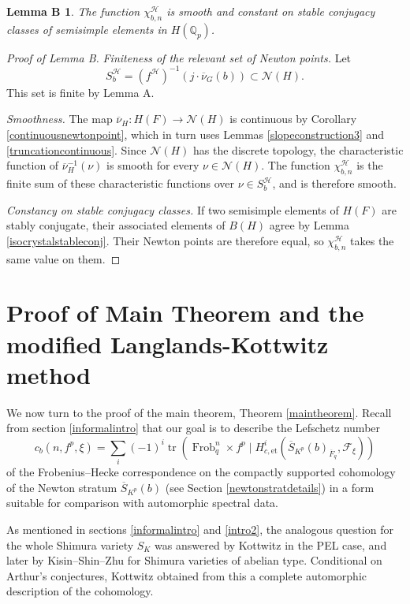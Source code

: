 \documentclass[11pt,a4paper]{article}
\theoremstyle{definition}
\theoremstyle{plain}
\theoremstyle{remark}
\theoremstyle{plain}
\newtheorem*{LemB}{Lemma B}
\DeclareMathOperator{\Frob}{Frob}
\DeclareMathOperator{\tr}{tr}
\begin{document}
\begin{LemB}
    The function $\chi_{b,n}^{\mathcal{H}}$ is smooth and constant on stable conjugacy classes of semisimple elements in $H(\mathbb{Q}_p)$.
\end{LemB}

\begin{proof}[Proof of Lemma B]
    \textit{Finiteness of the relevant set of Newton points.} Let
    $$S_b^{\mathcal H}=(f^{\mathcal H})^{-1}(j\cdot\overline{\nu}_G(b))\subset\mathcal N(H).$$
    This set is finite by Lemma A.

    \textit{Smoothness.} The map $\overline{\nu}_H:H(F)\rightarrow\mathcal N(H)$ is continuous by Corollary \ref{continuousnewtonpoint}, which in turn uses Lemmas \ref{slopeconstruction3} and \ref{truncationcontinuous}. Since $\mathcal N(H)$ has the discrete topology, the characteristic function of $\overline{\nu}_H^{-1}(\nu)$ is smooth for every $\nu\in\mathcal N(H)$. The function $\chi_{b,n}^{\mathcal H}$ is the finite sum of these characteristic functions over $\nu\in S_b^{\mathcal H}$, and is therefore smooth.

    \textit{Constancy on stable conjugacy classes.} If two semisimple elements of $H(F)$ are stably conjugate, their associated elements of $B(H)$ agree by Lemma \ref{isocrystalstableconj}. Their Newton points are therefore equal, so $\chi_{b,n}^{\mathcal H}$ takes the same value on them.
\end{proof}

\section{Proof of Main Theorem and the modified Langlands-Kottwitz method}\label{mainproof}

We now turn to the proof of the main theorem, Theorem \ref{maintheorem}. Recall from section \ref{informalintro} that our goal is to describe the Lefschetz number
$$c_b(n, f^p, \xi) = \sum_i (-1)^i \tr(\Frob_q^n \times f^p \mid H^i_{c,\mathrm{et}}(\overline{S}_{K^p}(b)_{\overline{F}_q}, \mathcal{F}_{\xi}))$$
of the Frobenius--Hecke correspondence on the compactly supported cohomology of the Newton stratum $\overline{S}_{K^p}(b)$ (see Section \ref{newtonstratdetails}) in a form suitable for comparison with automorphic spectral data.

As mentioned in sections \ref{informalintro} and \ref{intro2}, the analogous question for the whole Shimura variety $S_K$ was answered by Kottwitz \cite{MR1044820} in the PEL case, and later by Kisin--Shin--Zhu \cite{kisin2021stabletraceformulashimura} for Shimura varieties of abelian type. Conditional on Arthur's conjectures, Kottwitz obtained from this a complete automorphic description of the cohomology.
\end{document}
